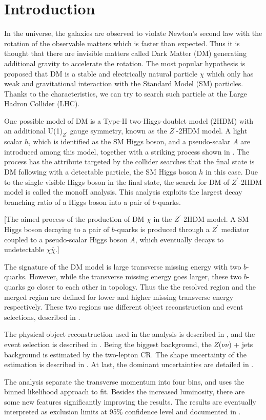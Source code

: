 \documentclass[class=NTHU_thesis, crop=false]{standalone}
\begin{document}
\chapter{Introduction}
\label{chap:Introduction}
In the universe, the galaxies are observed to violate Newton's second law with the rotation of the observable matters which is faster than expected. Thus it is thought that there are invisible matters called Dark Matter (DM) generating additional gravity to accelerate the rotation. The most popular hypothesis is proposed that DM is a stable and electrically natural particle $\chi$ which only has weak and gravitational interaction with the Standard Model (SM) particles. Thanks to the characteristics, we can try to search such particle at the Large Hadron Collider (LHC).

One possible model of DM is a Type-II two-Higgs-doublet model (2HDM) with an additional U(1)$_{Z^\prime}$ gauge symmetry, known as the $Z^\prime$-2HDM model. A light scalar $h$, which is identified as the SM Higgs boson, and a pseudo-scalar $A$ are introduced among this model, together with a striking process shown in . The process has the attribute targeted by the collider searches that the final state is DM following with a detectable particle, the SM Higgs boson $h$ in this case. Due to the single visible Higgs boson in the final state, the search for DM of $Z^\prime$-2HDM model is called the monoH analysis. This analysis exploits the largest decay branching ratio of a Higgs boson into a pair of $b$-quarks.

[The aimed process of the production of DM $\chi$ in the $Z^\prime$-2HDM model. A SM Higgs boson decaying to a pair of $b$-quarks is produced through a $Z^\prime$ mediator coupled to a pseudo-scalar Higgs boson $A$, which eventually decays to undetectable $\chi\bar{\chi}$.]

The signature of the DM model is large transverse missing energy with two $b$-quarks. However, while the transverse missing energy goes larger, these two $b$-quarks go closer to each other in topology. Thus the the resolved region and the merged region are defined for lower and higher missing transverse energy respectively. These two regions use different object reconstruction and event selections, described in .

The physical object reconstruction used in the analysis is described in , and the event selection is described in . Being the biggest background, the $Z$($\nu\nu$) + jets background is estimated by the two-lepton CR. The shape uncertainty of the estimation is described in . At last, the dominant uncertainties are detailed in .

The analysis separate the transverse momentum into four bins, and uses the binned likelihood approach to fit. Besides the increased luminosity, there are some new features significantly improving the results. The results are eventually interpreted as exclusion limits at 95\% confidence level and documented in .
\end{document}
